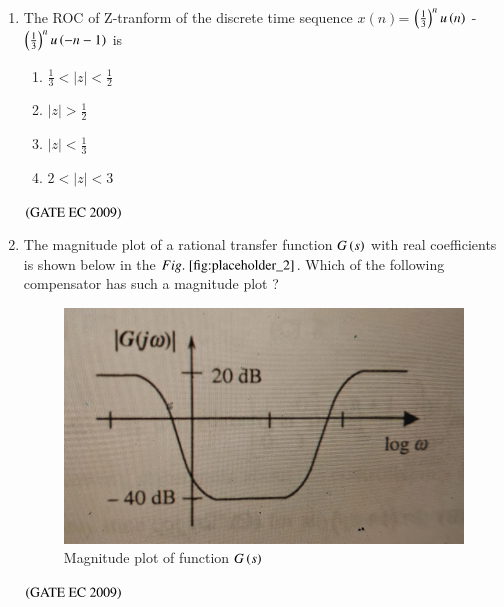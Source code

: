 \documentclass[journal,12pt,onecolumn]{IEEEtran}
\theoremstyle{remark}
\begin{document}
\begin{enumerate}[start=1, label={Q\arabic*.}]
\item The ROC of Z-tranform of the discrete time sequence $x(n)$= $\left(\frac{1}{3}\right)^n u\left(n\right)$ - $\left(\frac{1}{3}\right)^n u\left(-n-1\right)$ is 
\begin{enumerate}
\item $\frac{1}{3} <|z| <\frac{1}{2}$
\item $|z| >\frac{1}{2}$
\item $|z| <\frac{1}{3}$
\item $2<|z|<3$
\end{enumerate}
\hfill $\left(\text{GATE EC 2009}\right)$

\item The magnitude plot of a rational transfer function $G\left(s\right)$ with real coefficients is shown below in the $\figref{fig:placeholder_2}$. Which of the following compensator has such a magnitude plot ?
\begin{figure}[H]
    \centering
    \includegraphics[width=0.5\columnwidth]{figs/fig_2.jpg}
    \caption{\centering Magnitude plot of function $G\left(s\right)$ }
    \label{fig:placeholder_2}
\end{figure}
\begin{enumerate}
\end{enumerate}
\hfill $\left(\text{GATE EC 2009}\right)$


\end{enumerate}
\end{document}
